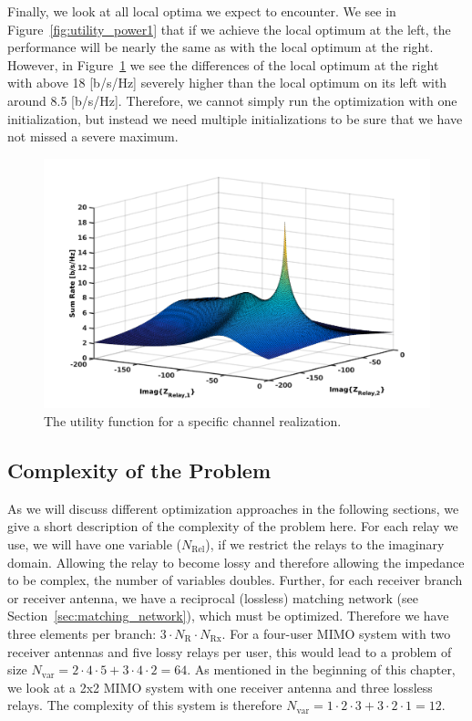 Finally, we look at all local optima we expect to encounter.
We see in Figure~\ref{fig:utility_power1} that if we achieve the local optimum at the left, the performance will be nearly the same as with the local optimum at the right.
However, in Figure~\ref{fig:utility_power4} we see the differences of the local optimum at the right with above 18 [b/s/Hz] severely higher than the local optimum on its left with around 8.5 [b/s/Hz].
Therefore, we cannot simply run the optimization with one initialization, but instead we need multiple initializations to be sure that we have not missed a severe maximum.
\begin{figure}[h]
\centering
  \includegraphics[width=0.8\linewidth]{images/full_mesh_highsnr_94.png}
\caption{The utility function for a specific channel realization.}
\label{fig:utility_power4}
\end{figure}

\subsection{Complexity of the Problem}
\label{sec:complexity}

As we will discuss different optimization approaches in the following sections, we give a short description of the complexity of the problem here.
For each relay we use, we will have one variable ($N_\text{Rel}$), if we restrict the relays to the imaginary domain.
Allowing the relay to become lossy and therefore allowing the impedance to be complex, the number of variables doubles.%
Further, for each receiver branch or receiver antenna, we have a reciprocal (lossless) matching network (see Section~\ref{sec:matching_network}), which must be optimized.
Therefore we have three elements per branch: $3\cdot N_\text{R}\cdot N_\text{Rx}$.
For a four-user MIMO system with two receiver antennas and five lossy relays per user, this would lead to a problem of size $N_\text{var} =  2\cdot 4\cdot 5 + 3\cdot 4\cdot 2 = 64$.
As mentioned in the beginning of this chapter, we look at a 2x2 MIMO system with one receiver antenna and three lossless relays.
The complexity of this system is therefore $N_\text{var} =  1\cdot 2\cdot 3 + 3\cdot 2\cdot 1 = 12$.

